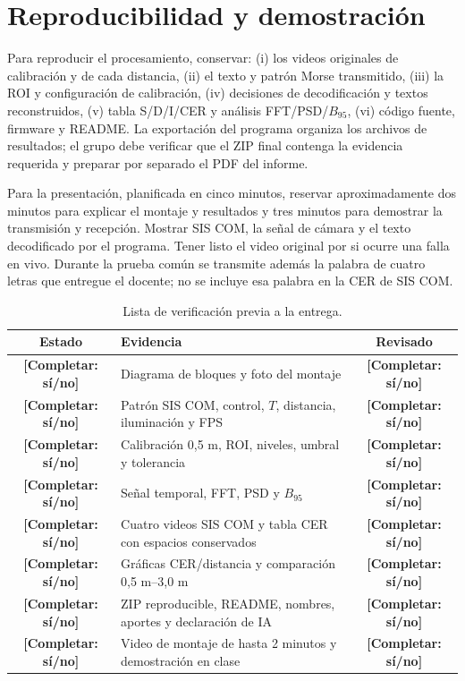 \documentclass[11pt,a4paper]{article}
\newcommand{\Completar}[1]{\textcolor{Pending}{\textbf{[Completar: #1]}}}
\begin{document}
\section{Reproducibilidad y demostración}
Para reproducir el procesamiento, conservar: (i) los videos originales de calibración y de cada distancia, (ii) el texto y patrón Morse transmitido, (iii) la ROI y configuración de calibración, (iv) decisiones de decodificación y textos reconstruidos, (v) tabla S/D/I/CER y análisis FFT/PSD/\(B_{95}\), (vi) código fuente, firmware y README. La exportación del programa organiza los archivos de resultados; el grupo debe verificar que el ZIP final contenga la evidencia requerida y preparar por separado el PDF del informe.

Para la presentación, planificada en cinco minutos, reservar aproximadamente dos minutos para explicar el montaje y resultados y tres minutos para demostrar la transmisión y recepción. Mostrar SIS COM, la señal de cámara y el texto decodificado por el programa. Tener listo el video original por si ocurre una falla en vivo. Durante la prueba común se transmite además la palabra de cuatro letras que entregue el docente; no se incluye esa palabra en la CER de SIS COM.

\begin{table}[H]
\centering
\caption{Lista de verificación previa a la entrega.}
\label{tab:checklist}
\begin{tabularx}{\textwidth}{c Y c}
\toprule
Estado & Evidencia & Revisado\\
\midrule
\Completar{sí/no} & Diagrama de bloques y foto del montaje & \Completar{sí/no}\\
\Completar{sí/no} & Patrón SIS COM, control, \(T\), distancia, iluminación y FPS & \Completar{sí/no}\\
\Completar{sí/no} & Calibración 0,5 m, ROI, niveles, umbral y tolerancia & \Completar{sí/no}\\
\Completar{sí/no} & Señal temporal, FFT, PSD y \(B_{95}\) & \Completar{sí/no}\\
\Completar{sí/no} & Cuatro videos SIS COM y tabla CER con espacios conservados & \Completar{sí/no}\\
\Completar{sí/no} & Gráficas CER/distancia y comparación 0,5 m--3,0 m & \Completar{sí/no}\\
\Completar{sí/no} & ZIP reproducible, README, nombres, aportes y declaración de IA & \Completar{sí/no}\\
\Completar{sí/no} & Video de montaje de hasta 2 minutos y demostración en clase & \Completar{sí/no}\\
\bottomrule
\end{tabularx}
\end{table}
\end{document}
